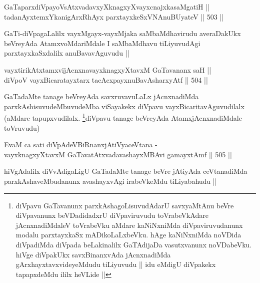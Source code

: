 
\begin{shl}
GaTaparxdiVpayoVsAtxvadavxyXknagxyXvayxcnajxkasaMgatiH || \\
tadanAyxtemxYkanigArxRhAyx parxtayxkeSxVNAnuBUyateV ||  503 ||  
\end{shl}

\begin{artha}
GaTi-diVpagaLalilx vayxMgayx-vayxMjaka saMbaMdhavirudu averaDakUkx beVreyAda AtamxvoMdariMdale I saMbaMdhavu tiLiyuvudAgi parxtayxkaSxdalilx anuBavavAguvudu ||
\end{artha}

\begin{shl}
vayxtirikAtxtamxvijAcnxnavayxknagxyXtavxM GaTavananx saH || \\
diVpoV vayxBicaratayxtarx tacAcxpayxnuBavAsharxyAtf ||  504 ||  
\end{shl}

\begin{artha}
GaTadaMte tanage beVreyAda savxruvavuLaLx jAcnxnadiMda parxkAshisuvudeMbuvudeMba viSayakekx diVpavu vayxBicaritavAguvudilalx (aMdare tapupxvudilalx. \footnote{diVpavu GaTavanunx parxkAshagoLisuvudAdarU savxyaMtAnu beVre diVpavanunx beVDadidadxrU diVpaviruvudu toVrabeVkAdare jAcnxnadiMdaleV toVrabeVku aMdare kaNiNxniMda diVpaviruvudanunx modalu parxtayxkaSx mADikoLaLxbeVku. hAge kaNiNxniMda noVDida diVpadiMda diVpada beLakinalilx GaTAdijaDa vasutxvanunx noVDabeVku. hiVge diVpakUkx savxBinanxvAda jAcnxnadiMda gArxhayxtavxvideyeMdudu tiLiyuvudu || idu eMdigU diVpakekx tapapxdeMdu ililx heVLide ||}diVpavu tanage beVreyAda AtamxjAcnxnadiMdale toVruvudu)
\end{artha}


\begin{shl}
EvaM ca sati diVpAdeVBiRnanxjAtiVyaceVtana -\\
vayxknagxyXtavxM GaTavatAtxvadavashayxMBAvi gamayxtAmf ||  505 ||  
\end{shl}

\begin{artha}
hiVgAdalilx diVvAdigaLigU GaTadaMte tanage beVre jAtiyAda ceVtanadiMda parxkAshaveMbudanunx avashayxvAgi irabeVkeMdu tiLiyabahudu ||
\end{artha}


